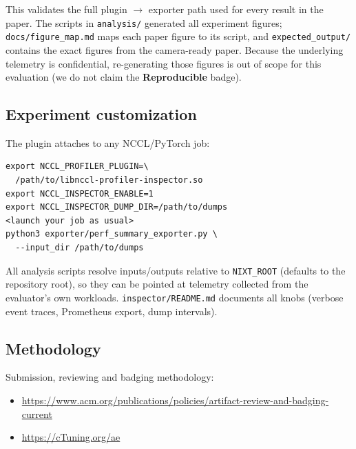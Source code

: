 \documentclass[10pt,twocolumn]{article}
\begin{document}
This validates the full plugin $\rightarrow$ exporter path used for
every result in the paper. The scripts in \texttt{analysis/}
generated all experiment figures; \texttt{docs/figure\_map.md} maps
each paper figure to its script, and \texttt{expected\_output/}
contains the exact figures from the camera-ready paper. Because the
underlying telemetry is confidential, re-generating those figures
is out of scope for this evaluation (we do not claim the
\textbf{Reproducible} badge).

\subsection{Experiment customization}

The plugin attaches to any NCCL/PyTorch job:

{\small
\begin{verbatim}
export NCCL_PROFILER_PLUGIN=\
  /path/to/libnccl-profiler-inspector.so
export NCCL_INSPECTOR_ENABLE=1
export NCCL_INSPECTOR_DUMP_DIR=/path/to/dumps
<launch your job as usual>
python3 exporter/perf_summary_exporter.py \
  --input_dir /path/to/dumps
\end{verbatim}
}

All analysis scripts resolve inputs/outputs relative to
\texttt{NIXT\_ROOT} (defaults to the repository root), so they can
be pointed at telemetry collected from the evaluator's own
workloads. \texttt{inspector/README.md} documents all knobs
(verbose event traces, Prometheus export, dump intervals).

\subsection{Methodology}

Submission, reviewing and badging methodology:

\begin{itemize}
  \item \url{https://www.acm.org/publications/policies/artifact-review-and-badging-current}
  \item \url{https://cTuning.org/ae}
\end{itemize}
\end{document}

